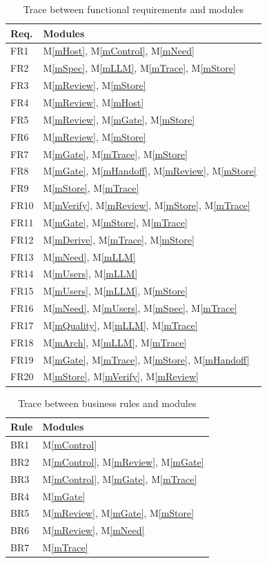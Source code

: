 \documentclass[12pt, titlepage]{article}
\newcommand{\mref}[1]{M\ref{#1}}
\begin{document}
\begin{longtable}{p{} p{}}
\caption{Trace between functional requirements and modules} \label{TblRT}\\
\toprule
\textbf{Req.} & \textbf{Modules}\\
\midrule
\endhead
FR1 & \mref{mHost}, \mref{mControl}, \mref{mNeed}\\
FR2 & \mref{mSpec}, \mref{mLLM}, \mref{mTrace}, \mref{mStore}\\
FR3 & \mref{mReview}, \mref{mStore}\\
FR4 & \mref{mReview}, \mref{mHost}\\
FR5 & \mref{mReview}, \mref{mGate}, \mref{mStore}\\
FR6 & \mref{mReview}, \mref{mStore}\\
FR7 & \mref{mGate}, \mref{mTrace}, \mref{mStore}\\
FR8 & \mref{mGate}, \mref{mHandoff}, \mref{mReview}, \mref{mStore}\\
FR9 & \mref{mStore}, \mref{mTrace}\\
FR10 & \mref{mVerify}, \mref{mReview}, \mref{mStore}, \mref{mTrace}\\
FR11 & \mref{mGate}, \mref{mStore}, \mref{mTrace}\\
FR12 & \mref{mDerive}, \mref{mTrace}, \mref{mStore}\\
FR13 & \mref{mNeed}, \mref{mLLM}\\
FR14 & \mref{mUsers}, \mref{mLLM}\\
FR15 & \mref{mUsers}, \mref{mLLM}, \mref{mStore}\\
FR16 & \mref{mNeed}, \mref{mUsers}, \mref{mSpec}, \mref{mTrace}\\
FR17 & \mref{mQuality}, \mref{mLLM}, \mref{mTrace}\\
FR18 & \mref{mArch}, \mref{mLLM}, \mref{mTrace}\\
FR19 & \mref{mGate}, \mref{mTrace}, \mref{mStore}, \mref{mHandoff}\\
FR20 & \mref{mStore}, \mref{mVerify}, \mref{mReview}\\
\bottomrule
\end{longtable}

\begin{longtable}{p{} p{}}
\caption{Trace between business rules and modules} \label{TblBR}\\
\toprule
\textbf{Rule} & \textbf{Modules}\\
\midrule
\endhead
BR1 & \mref{mControl}\\
BR2 & \mref{mControl}, \mref{mReview}, \mref{mGate}\\
BR3 & \mref{mControl}, \mref{mGate}, \mref{mTrace}\\
BR4 & \mref{mGate}\\
BR5 & \mref{mReview}, \mref{mGate}, \mref{mStore}\\
BR6 & \mref{mReview}, \mref{mNeed}\\
BR7 & \mref{mTrace}\\
\bottomrule
\end{longtable}
\end{document}
